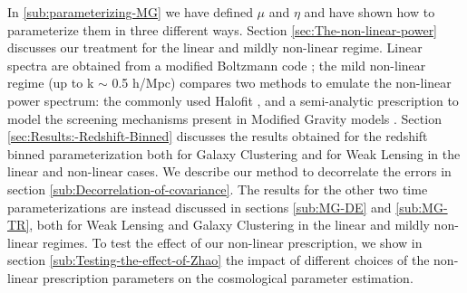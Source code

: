 
In \cref{sub:parameterizing-MG} we have defined $\mu$ and $\eta$ and have shown how to parameterize them in three different ways. 
Section \ref{sec:The-non-linear-power} discusses our treatment for the linear and mildly non-linear regime. Linear spectra are obtained from a modified Boltzmann
code \cite{hojjati_testing_2011}; the mild non-linear regime (up to k $\sim$ 0.5 h/Mpc) compares two methods to emulate the non-linear power spectrum: the commonly used Halofit \cite{smith_stable_2003, takahashi_revising_2012}, and a semi-analytic prescription to model
the screening mechanisms present in Modified Gravity models \cite{hu_parameterized_2007}.
Section \ref{sec:Results:-Redshift-Binned} discusses the results
obtained for the redshift binned parameterization both for Galaxy Clustering
and for Weak Lensing in the linear and non-linear cases. We describe our method to decorrelate the errors in section
\ref{sub:Decorrelation-of-covariance}. The results for the other two time parameterizations are instead discussed in sections \ref{sub:MG-DE} and \ref{sub:MG-TR}, both for Weak Lensing and Galaxy Clustering in the linear and mildly non-linear
regimes. To test the effect of our non-linear prescription, we show in section \ref{sub:Testing-the-effect-of-Zhao} the impact of different choices of the non-linear prescription parameters on the cosmological parameter estimation.




